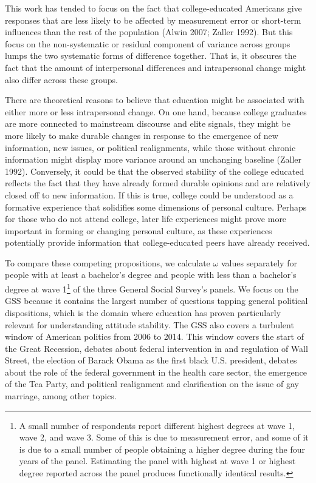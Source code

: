 \documentclass[
  12pt,
]{article}
\begin{document}
This work has tended to focus on the fact that college-educated
Americans give responses that are less likely to be affected by
measurement error or short-term influences than the rest of the
population (Alwin 2007; Zaller 1992). But this focus on the
non-systematic or residual component of variance across groups lumps the
two systematic forms of difference together. That is, it obscures the
fact that the amount of interpersonal differences and intrapersonal
change might also differ across these groups.

There are theoretical reasons to believe that education might be
associated with either more or less intrapersonal change. On one hand,
because college graduates are more connected to mainstream discourse and
elite signals, they might be more likely to make durable changes in
response to the emergence of new information, new issues, or political
realignments, while those without chronic information might display more
variance around an unchanging baseline (Zaller 1992). Conversely, it
could be that the observed stability of the college educated reflects
the fact that they have already formed durable opinions and are
relatively closed off to new information. If this is true, college could
be understood as a formative experience that solidifies some dimensions
of personal culture. Perhaps for those who do not attend college, later
life experiences might prove more important in forming or changing
personal culture, as these experiences potentially provide information
that college-educated peers have already received.

To compare these competing propositions, we calculate \(\omega\) values
separately for people with at least a bachelor's degree and people with
less than a bachelor's degree at wave 1\footnote{A small number of
  respondents report different highest degrees at wave 1, wave 2, and
  wave 3. Some of this is due to measurement error, and some of it is
  due to a small number of people obtaining a higher degree during the
  four years of the panel. Estimating the panel with highest at wave 1
  or highest degree reported across the panel produces functionally
  identical results.} of the three General Social Survey's panels. We
focus on the GSS because it contains the largest number of questions
tapping general political dispositions, which is the domain where
education has proven particularly relevant for understanding attitude
stability. The GSS also covers a turbulent window of American politics
from 2006 to 2014. This window covers the start of the Great Recession,
debates about federal intervention in and regulation of Wall Street, the
election of Barack Obama as the first black U.S. president, debates
about the role of the federal government in the health care sector, the
emergence of the Tea Party, and political realignment and clarification
on the issue of gay marriage, among other topics.
\end{document}
